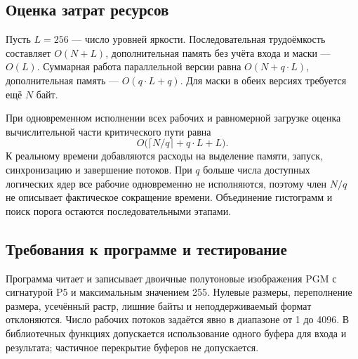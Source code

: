 \subsection{Оценка затрат ресурсов}
Пусть $L=256$ --- число уровней яркости. Последовательная трудоёмкость составляет $O(N+L)$, дополнительная память без учёта входа и маски --- $O(L)$. Суммарная работа параллельной версии равна $O(N+q\cdot L)$, дополнительная память --- $O(q\cdot L+q)$. Для маски в обеих версиях требуется ещё $N$ байт.

При одновременном исполнении всех рабочих и равномерной загрузке оценка вычислительной части критического пути равна
\begin{equation}
O\bigl(\lceil N/q\rceil+q\cdot L+L\bigr).
\end{equation}
К реальному времени добавляются расходы на выделение памяти, запуск, синхронизацию и завершение потоков. При $q$ больше числа доступных логических ядер все рабочие одновременно не исполняются, поэтому член $N/q$ не описывает фактическое сокращение времени. Объединение гистограмм и поиск порога остаются последовательными этапами.

\subsection{Требования к программе и тестирование}
Программа читает и записывает двоичные полутоновые изображения PGM с сигнатурой P5 и максимальным значением 255. Нулевые размеры, переполнение размера, усечённый растр, лишние байты и неподдерживаемый формат отклоняются. Число рабочих потоков задаётся явно в диапазоне от 1 до 4096. В библиотечных функциях допускается использование одного буфера для входа и результата; частичное перекрытие буферов не допускается.

